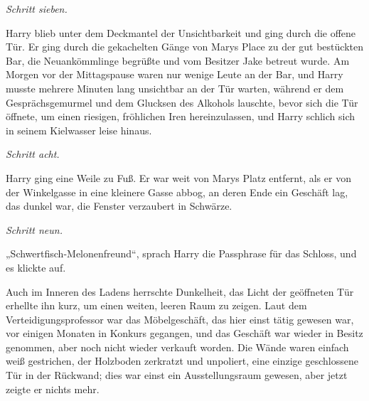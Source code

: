 \emph{Schritt sieben.}

Harry blieb unter dem Deckmantel der Unsichtbarkeit und ging durch die offene Tür. Er ging durch die gekachelten Gänge von Marys Place zu der gut bestückten Bar, die Neuankömmlinge begrüßte und vom Besitzer Jake betreut wurde. Am Morgen vor der Mittagspause waren nur wenige Leute an der Bar, und Harry musste mehrere Minuten lang unsichtbar an der Tür warten, während er dem Gesprächsgemurmel und dem Glucksen des Alkohols lauschte, bevor sich die Tür öffnete, um einen riesigen, fröhlichen Iren hereinzulassen, und Harry schlich sich in seinem Kielwasser leise hinaus.

\emph{Schritt acht.}

Harry ging eine Weile zu Fuß. Er war weit von Marys Platz entfernt, als er von der Winkelgasse in eine kleinere Gasse abbog, an deren Ende ein Geschäft lag, das dunkel war, die Fenster verzaubert in Schwärze.

\emph{Schritt neun.}

„Schwertfisch-Melonenfreund“, sprach Harry die Passphrase für das Schloss, und es klickte auf.

Auch im Inneren des Ladens herrschte Dunkelheit, das Licht der geöffneten Tür erhellte ihn kurz, um einen weiten, leeren Raum zu zeigen. Laut dem Verteidigungsprofessor war das Möbelgeschäft, das hier einst tätig gewesen war, vor einigen Monaten in Konkurs gegangen, und das Geschäft war wieder in Besitz genommen, aber noch nicht wieder verkauft worden. Die Wände waren einfach weiß gestrichen, der Holzboden zerkratzt und unpoliert, eine einzige geschlossene Tür in der Rückwand; dies war einst ein Ausstellungsraum gewesen, aber jetzt zeigte er nichts mehr.

